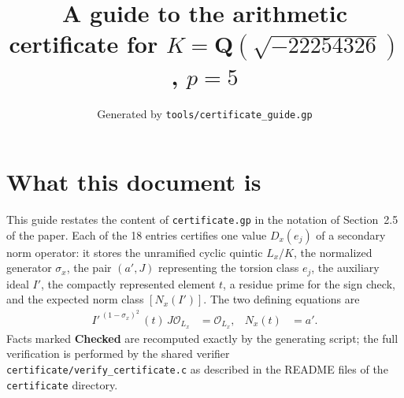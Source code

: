 \documentclass[11pt]{article}
\title{A guide to the arithmetic certificate for $K=\mathbf Q(\sqrt{-22254326})$, $p=5$}
\author{}
\date{Generated by \texttt{tools/certificate\_guide.gp}}
\begin{document}
\maketitle
\section*{What this document is}
This guide restates the content of \texttt{certificate.gp} in the
notation of Section~2.5 of the paper.  Each of the 18 entries
certifies one value $D_x(e_j)$ of a secondary norm operator: it
stores the unramified cyclic quintic $L_x/K$, the normalized
generator $\sigma_x$, the pair $(a',J)$ representing the torsion
class $e_j$, the auxiliary ideal $I'$, the compactly represented
element $t$, a residue prime for the sign check, and the expected
norm class $[N_x(I')]$.  The two defining equations are
\begin{align*}
I'^{\,(1-\sigma_x)^2}\,(t)\,J\mathcal O_{L_x}&=\mathcal O_{L_x},&
N_x(t)&=a'.
\end{align*}
Facts marked \textbf{Checked} are recomputed exactly by the
generating script; the full verification is performed by the
shared verifier \texttt{certificate/verify\_certificate.c} as
described in the README files of the \texttt{certificate}
directory.
\end{document}
